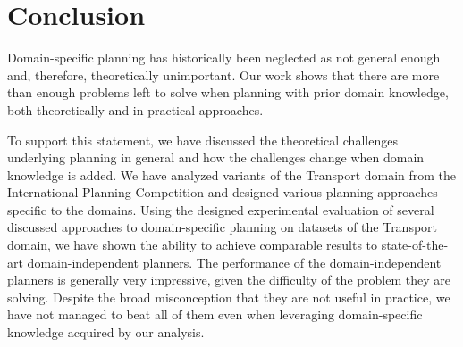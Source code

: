 \chapter*{Conclusion}

Domain-specific planning has historically been neglected as not general enough
and, therefore, theoretically unimportant.
Our work shows that there are more than enough problems
left to solve when planning with prior domain knowledge,
both theoretically and in practical approaches.

To support this statement,
we have discussed the theoretical challenges underlying
planning in general and how the challenges change when
domain knowledge is added.
We have analyzed variants of the Transport domain from the International Planning Competition
and designed various planning approaches specific to the domains.
Using the designed experimental evaluation of several discussed approaches to
domain-specific planning on datasets of the Transport domain, we have shown the ability to achieve comparable results to state-of-the-art domain-independent planners.
The performance of the domain-independent planners is generally very impressive, given the difficulty of the problem they are solving. Despite the broad misconception that they are not useful in practice,
we have not managed to beat all of them even when leveraging domain-specific knowledge acquired by our analysis.

